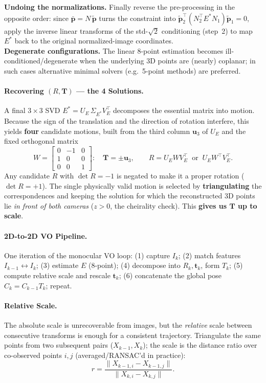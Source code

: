 \documentclass{article}
\begin{document}
\textbf{Undoing the normalizations.}
Finally reverse the pre-processing in the opposite order: since $\bar{\mathbf p}=N\,\tilde{\mathbf p}$ turns the constraint into $\tilde{\mathbf p}_2^\top(N_2^\top E^\ast N_1)\tilde{\mathbf p}_1=0$, apply the inverse linear transforms of the std-$\sqrt2$ conditioning (step~2) to map $E^\ast$ back to the original normalized-image coordinates.\\

\textbf{Degenerate configurations.}
The linear 8-point estimation becomes ill-conditioned/degenerate when the underlying 3D points are (nearly)
coplanar; in such cases alternative minimal solvers (e.g.\ 5-point methods) are preferred.

\paragraph{Recovering $(R,\mathbf T)$ — the 4 Solutions.} A final $3\times3$ SVD $E^\ast=U_E\,\Sigma_{E^\ast}V_E^\top$ decomposes the essential matrix into motion. Because the sign of the translation and the direction of rotation interfere, this yields \textbf{four} candidate motions, built from the third column $\mathbf u_3$ of $U_E$ and the fixed orthogonal matrix
\vspace{-0.3cm}
\[
W=\begin{bmatrix}0&-1&0\\ 1&0&0\\ 0&0&1\end{bmatrix}:
\quad
\mathbf T=\pm\mathbf u_3,
\qquad
R=U_E W V_E^\top \ \text{ or }\ U_E W^\top V_E^\top .
\]
Any candidate $R$ with $\det R=-1$ is negated to make it a proper rotation ($\det R=+1$). The single physically valid motion is selected by \textbf{triangulating} the correspondences and keeping the solution for which the reconstructed 3D points lie \emph{in front of both cameras} ($z>0$, the cheirality check). This \textbf{gives us $\mathbf T$ up to scale}.

\paragraph{2D-to-2D VO Pipeline.} One iteration of the monocular VO loop: (1) capture $I_k$; (2) match features $I_{k-1}\!\leftrightarrow\! I_k$; (3) estimate $E$ (8-point); (4) decompose into $R_k,\mathbf t_k$, form $T_k$; (5) compute relative scale and rescale $\mathbf t_k$; (6) concatenate the global pose $C_k = C_{k-1}T_k$; repeat.

\paragraph{Relative Scale.} The absolute scale is unrecoverable from images, but the \textit{relative} scale between consecutive transforms is enough for a consistent trajectory. Triangulate the same points from two subsequent pairs ($X_{k-1},X_k$); the scale is the distance ratio over co-observed points $i,j$ (averaged/RANSAC'd in practice):
\[
r = \frac{\lVert X_{k-1,i}-X_{k-1,j}\rVert}{\lVert X_{k,i}-X_{k,j}\rVert}.
\]
\vspace{-0.8cm}
\end{document}
